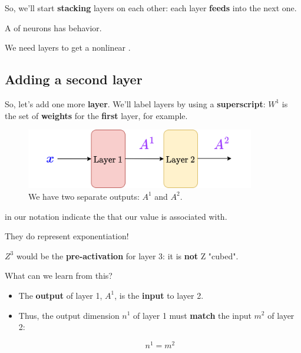         So, we'll start \textbf{stacking} layers on each other: each layer \textbf{feeds} into the next one.\\
        
        \begin{concept}
            A  of neurons has  behavior.
            
            We need  layers to get a nonlinear .
        \end{concept}
    
    \subsection{Adding a second layer}
    
        So, let's add one more \textbf{layer}. We'll label layers by using a \textbf{superscript}: $W^1$ is the set of \textbf{weights} for the \textbf{first} layer, for example.
        
        \begin{figure}[H]
            \centering
            \includegraphics[width=100mm,scale=0.4]{images/nn_images/two_layers.png}
            \caption*{We have two separate outputs: $A^1$ and $A^2$.}
        \end{figure}
        
        \begin{clarification}
             in our notation indicate the  that our value is associated with.
            
            They do  represent exponentiation! 
        \end{clarification}
        
        \miniex $Z^3$ would be the \textbf{pre-activation} for layer 3: it is \textbf{not} Z "cubed".
        
        What can we learn from this?
        
        \begin{itemize}
            \item The \textbf{output} of layer 1, $A^1$, is the \textbf{input} to layer 2.
            
            \item Thus, the output dimension $n^1$ of layer 1 must \textbf{match} the input $m^2$ of layer 2: 
            
            \begin{equation}
                n^1=m^2
            \end{equation}
        \end{itemize}
        
